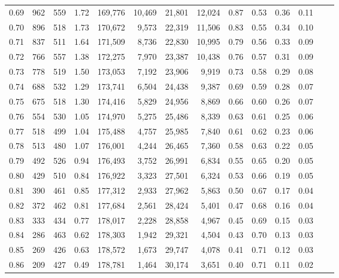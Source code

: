 \begin{tabular}{rrrrrrrrrrrrrr}
0.69 &    962 &  559 &    1.72 &  169,776 &   10,469 &  21,801 &  12,024 &  0.87 &  0.53 &  0.36 &      0.11 \\
0.70 &    896 &  518 &    1.73 &  170,672 &    9,573 &  22,319 &  11,506 &  0.83 &  0.55 &  0.34 &      0.10 \\
0.71 &    837 &  511 &    1.64 &  171,509 &    8,736 &  22,830 &  10,995 &  0.79 &  0.56 &  0.33 &      0.09 \\
0.72 &    766 &  557 &    1.38 &  172,275 &    7,970 &  23,387 &  10,438 &  0.76 &  0.57 &  0.31 &      0.09 \\
0.73 &    778 &  519 &    1.50 &  173,053 &    7,192 &  23,906 &   9,919 &  0.73 &  0.58 &  0.29 &      0.08 \\
0.74 &    688 &  532 &    1.29 &  173,741 &    6,504 &  24,438 &   9,387 &  0.69 &  0.59 &  0.28 &      0.07 \\
0.75 &    675 &  518 &    1.30 &  174,416 &    5,829 &  24,956 &   8,869 &  0.66 &  0.60 &  0.26 &      0.07 \\
0.76 &    554 &  530 &    1.05 &  174,970 &    5,275 &  25,486 &   8,339 &  0.63 &  0.61 &  0.25 &      0.06 \\
0.77 &    518 &  499 &    1.04 &  175,488 &    4,757 &  25,985 &   7,840 &  0.61 &  0.62 &  0.23 &      0.06 \\
0.78 &    513 &  480 &    1.07 &  176,001 &    4,244 &  26,465 &   7,360 &  0.58 &  0.63 &  0.22 &      0.05 \\
0.79 &    492 &  526 &    0.94 &  176,493 &    3,752 &  26,991 &   6,834 &  0.55 &  0.65 &  0.20 &      0.05 \\
0.80 &    429 &  510 &    0.84 &  176,922 &    3,323 &  27,501 &   6,324 &  0.53 &  0.66 &  0.19 &      0.05 \\
0.81 &    390 &  461 &    0.85 &  177,312 &    2,933 &  27,962 &   5,863 &  0.50 &  0.67 &  0.17 &      0.04 \\
0.82 &    372 &  462 &    0.81 &  177,684 &    2,561 &  28,424 &   5,401 &  0.47 &  0.68 &  0.16 &      0.04 \\
0.83 &    333 &  434 &    0.77 &  178,017 &    2,228 &  28,858 &   4,967 &  0.45 &  0.69 &  0.15 &      0.03 \\
0.84 &    286 &  463 &    0.62 &  178,303 &    1,942 &  29,321 &   4,504 &  0.43 &  0.70 &  0.13 &      0.03 \\
0.85 &    269 &  426 &    0.63 &  178,572 &    1,673 &  29,747 &   4,078 &  0.41 &  0.71 &  0.12 &      0.03 \\
0.86 &    209 &  427 &    0.49 &  178,781 &    1,464 &  30,174 &   3,651 &  0.40 &  0.71 &  0.11 &      0.02 \\

\end{tabular}
